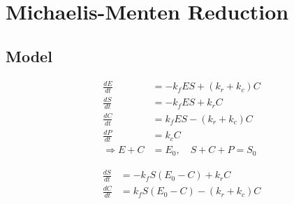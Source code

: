 \documentclass{article}
\begin{document}
\section{Michaelis-Menten Reduction}
\subsection{Model}
\begin{center}
\end{center}

\begin{align}
    \frac{d E}{d t} &= - k_f E S + (k_r + k_c) C \label{dEdt} \\
    \frac{d S}{d t} &= - k_f E S + k_r C  \label{dSdt} \\ 
    \frac{d C}{d t} &= k_f E S - (k_r + k_c) C \label{dCdt} \\
    \frac{d P}{d t} &= k_c C \\
    \Longrightarrow E + C &= E_0,  \quad S + C + P = S_0
\end{align}

\begin{align}
    \frac{d S}{d t} &= - k_f S (E_0 - C) + k_r C  \label{eq1} \\ 
    \frac{d C}{d t} &= k_f S (E_0 - C) - (k_r + k_c) C \label{eq2}
\end{align}
\end{document}
